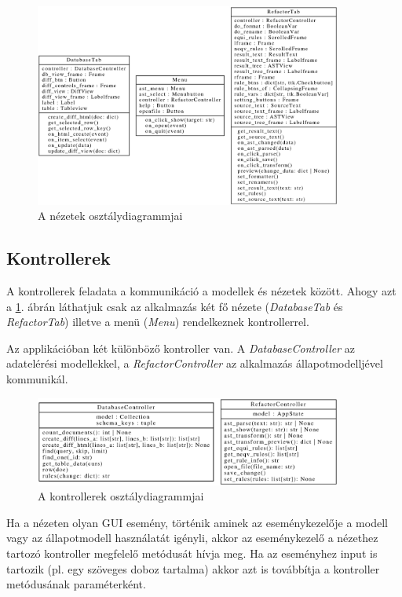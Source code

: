 \begin{figure}[H]
	\centering
	\includegraphics[width=0.9\textwidth]{images/uml/views.eps}
	\caption{\label{fig:views}A nézetek osztálydiagrammjai}
\end{figure}

\subsection{Kontrollerek}

A kontrollerek feladata a kommunikáció a modellek és nézetek között.
Ahogy azt a \ref{fig:views}. ábrán láthatjuk csak az alkalmazás
két fő nézete (\emph{DatabaseTab} és \emph{RefactorTab})
illetve a menü (\emph{Menu}) rendelkeznek kontrollerrel.

Az applikációban két különböző kontroller van.
A \emph{DatabaseController} az adatelérési modellekkel,
a \emph{RefactorController} az alkalmazás állapotmodelljével kommunikál.

\begin{figure}[H]
	\centering
	\includegraphics[width=0.9\textwidth]{images/uml/controllers.eps}
	\caption{\label{fig:controllers}A kontrollerek osztálydiagrammjai}
\end{figure}

Ha a nézeten olyan GUI esemény, történik aminek az eseménykezelője
a modell vagy az állapotmodell használatát igényli,
akkor az eseménykezelő a nézethez tartozó kontroller megfelelő metódusát hívja meg.
Ha az eseményhez input is tartozik (pl. egy szöveges doboz tartalma) akkor
azt is továbbítja a kontroller metódusának paraméterként.

